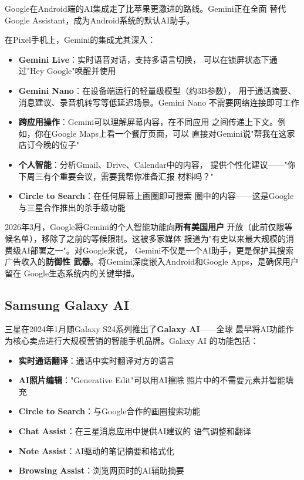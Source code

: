 Google在Android端的AI集成走了比苹果更激进的路线。Gemini正在全面
替代Google Assistant，成为Android系统的默认AI助手。

在Pixel手机上，Gemini的集成尤其深入：

\begin{itemize}
  \item \textbf{Gemini Live}：实时语音对话，支持多语言切换，
    可以在锁屏状态下通过"Hey Google"唤醒并使用
  \item \textbf{Gemini Nano}：在设备端运行的轻量级模型（约3B参数），
    用于通话摘要、消息建议、录音机转写等低延迟场景。Gemini Nano
    不需要网络连接即可工作
  \item \textbf{跨应用操作}：Gemini可以理解屏幕内容，在不同应用
    之间传递上下文。例如，你在Google Maps上看一个餐厅页面，可以
    直接对Gemini说"帮我在这家店订今晚的位子"
  \item \textbf{个人智能}：分析Gmail、Drive、Calendar中的内容，
    提供个性化建议——"你下周三有个重要会议，需要我帮你准备汇报
    材料吗？"
  \item \textbf{Circle to Search}：在任何屏幕上画圈即可搜索
    圈中的内容——这是Google与三星合作推出的杀手级功能
\end{itemize}

2026年3月，Google将Gemini的个人智能功能向\textbf{所有美国用户}
开放（此前仅限等候名单），移除了之前的等候限制。这被多家媒体
报道为"有史以来最大规模的消费级AI部署之一"。对Google来说，
Gemini不仅是一个AI助手，更是保护其搜索广告收入的\textbf{防御性
武器}。将Gemini深度嵌入Android和Google Apps，是确保用户留在
Google生态系统内的关键举措。

\subsection{Samsung Galaxy AI}
\label{subsec:samsung-galaxy-ai}

三星在2024年1月随Galaxy S24系列推出了\textbf{Galaxy AI}——全球
最早将AI功能作为核心卖点进行大规模营销的智能手机品牌。Galaxy AI
的功能包括：

\begin{itemize}
  \item \textbf{实时通话翻译}：通话中实时翻译对方的语言
  \item \textbf{AI照片编辑}："Generative Edit"可以用AI擦除
    照片中的不需要元素并智能填充
  \item \textbf{Circle to Search}：与Google合作的画圈搜索功能
  \item \textbf{Chat Assist}：在三星消息应用中提供AI建议的
    语气调整和翻译
  \item \textbf{Note Assist}：AI驱动的笔记摘要和格式化
  \item \textbf{Browsing Assist}：浏览网页时的AI辅助摘要
\end{itemize}

